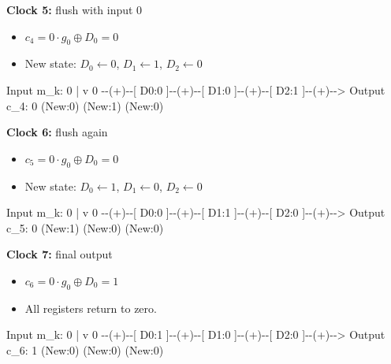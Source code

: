 \documentclass[
]{article}
\newenvironment{Shaded}{}{}
\newcommand{\NormalTok}[1]{#1}
\providecommand{\tightlist}{%
  \setlength{\itemsep}{0pt}\setlength{\parskip}{0pt}}
\begin{document}
\textbf{Clock 5:} flush with input 0

\begin{itemize}
\tightlist
\item
  \(c_4 = 0 \cdot g_0 \oplus D_0 = 0\)
\item
  New state: \(D_0 \leftarrow 0\), \(D_1 \leftarrow 1\),
  \(D_2 \leftarrow 0\)
\end{itemize}

\begin{Shaded}
\begin{Highlighting}[]
\NormalTok{Input m\_k: 0}
\NormalTok{     |}
\NormalTok{     v}
\NormalTok{0 {-}{-}(+){-}{-}[ D0:0 ]{-}{-}(+){-}{-}[ D1:0 ]{-}{-}(+){-}{-}[ D2:1 ]{-}{-}(+){-}{-}\textgreater{} Output c\_4: 0}
\NormalTok{         (New:0)        (New:1)        (New:0)}
\end{Highlighting}
\end{Shaded}

\textbf{Clock 6:} flush again

\begin{itemize}
\tightlist
\item
  \(c_5 = 0 \cdot g_0 \oplus D_0 = 0\)
\item
  New state: \(D_0 \leftarrow 1\), \(D_1 \leftarrow 0\),
  \(D_2 \leftarrow 0\)
\end{itemize}

\begin{Shaded}
\begin{Highlighting}[]
\NormalTok{Input m\_k: 0}
\NormalTok{     |}
\NormalTok{     v}
\NormalTok{0 {-}{-}(+){-}{-}[ D0:0 ]{-}{-}(+){-}{-}[ D1:1 ]{-}{-}(+){-}{-}[ D2:0 ]{-}{-}(+){-}{-}\textgreater{} Output c\_5: 0}
\NormalTok{         (New:1)        (New:0)        (New:0)}
\end{Highlighting}
\end{Shaded}

\textbf{Clock 7:} final output

\begin{itemize}
\tightlist
\item
  \(c_6 = 0 \cdot g_0 \oplus D_0 = 1\)
\item
  All registers return to zero.
\end{itemize}

\begin{Shaded}
\begin{Highlighting}[]
\NormalTok{Input m\_k: 0}
\NormalTok{     |}
\NormalTok{     v}
\NormalTok{0 {-}{-}(+){-}{-}[ D0:1 ]{-}{-}(+){-}{-}[ D1:0 ]{-}{-}(+){-}{-}[ D2:0 ]{-}{-}(+){-}{-}\textgreater{} Output c\_6: 1}
\NormalTok{         (New:0)        (New:0)        (New:0)}
\end{Highlighting}
\end{Shaded}
\end{document}

